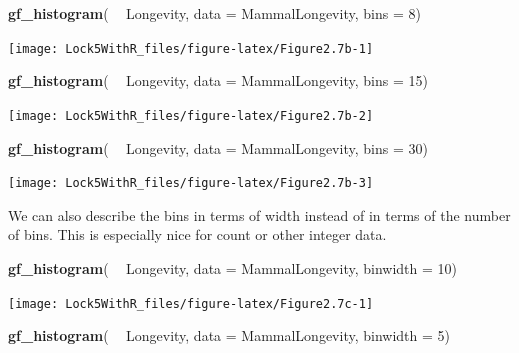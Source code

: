 \documentclass[]{book}
\newenvironment{Shaded}{\begin{snugshade}}{\end{snugshade}}
\newcommand{\DataTypeTok}[1]{\textcolor[rgb]{0.13,0.29,0.53}{#1}}
\newcommand{\DecValTok}[1]{\textcolor[rgb]{0.00,0.00,0.81}{#1}}
\newcommand{\KeywordTok}[1]{\textcolor[rgb]{0.13,0.29,0.53}{\textbf{#1}}}
\newcommand{\NormalTok}[1]{#1}
\newcommand{\OperatorTok}[1]{\textcolor[rgb]{0.81,0.36,0.00}{\textbf{#1}}}
\newcommand{\StringTok}[1]{\textcolor[rgb]{0.31,0.60,0.02}{#1}}
\begin{document}
\begin{Shaded}
\begin{Highlighting}[]
\KeywordTok{gf_histogram}\NormalTok{( }\OperatorTok{~}\StringTok{ }\NormalTok{Longevity, }\DataTypeTok{data =}\NormalTok{ MammalLongevity, }\DataTypeTok{bins =} \DecValTok{8}\NormalTok{)}
\end{Highlighting}
\end{Shaded}

\texttt{[image: Lock5WithR\_files/figure-latex/Figure2.7b-1]}

\begin{Shaded}
\begin{Highlighting}[]
\KeywordTok{gf_histogram}\NormalTok{( }\OperatorTok{~}\StringTok{ }\NormalTok{Longevity, }\DataTypeTok{data =}\NormalTok{ MammalLongevity, }\DataTypeTok{bins =} \DecValTok{15}\NormalTok{)}
\end{Highlighting}
\end{Shaded}

\texttt{[image: Lock5WithR\_files/figure-latex/Figure2.7b-2]}

\begin{Shaded}
\begin{Highlighting}[]
\KeywordTok{gf_histogram}\NormalTok{( }\OperatorTok{~}\StringTok{ }\NormalTok{Longevity, }\DataTypeTok{data =}\NormalTok{ MammalLongevity, }\DataTypeTok{bins =} \DecValTok{30}\NormalTok{)}
\end{Highlighting}
\end{Shaded}

\texttt{[image: Lock5WithR\_files/figure-latex/Figure2.7b-3]}

We can also describe the bins in terms of width instead of in terms of the number of bins. This is especially nice for count or other integer data.

\begin{Shaded}
\begin{Highlighting}[]
\KeywordTok{gf_histogram}\NormalTok{( }\OperatorTok{~}\StringTok{ }\NormalTok{Longevity, }\DataTypeTok{data =}\NormalTok{ MammalLongevity, }\DataTypeTok{binwidth =} \DecValTok{10}\NormalTok{)}
\end{Highlighting}
\end{Shaded}

\texttt{[image: Lock5WithR\_files/figure-latex/Figure2.7c-1]}

\begin{Shaded}
\begin{Highlighting}[]
\KeywordTok{gf_histogram}\NormalTok{( }\OperatorTok{~}\StringTok{ }\NormalTok{Longevity, }\DataTypeTok{data =}\NormalTok{ MammalLongevity, }\DataTypeTok{binwidth =} \DecValTok{5}\NormalTok{)}
\end{Highlighting}
\end{Shaded}
\end{document}
